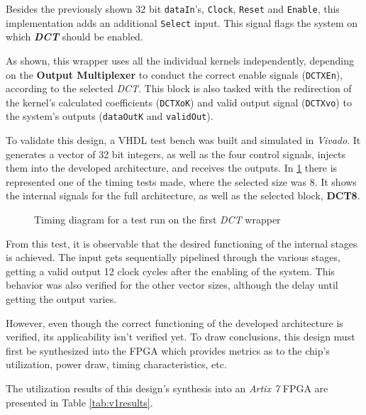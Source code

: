 Besides the previously shown 32 bit \texttt{dataIn}'s, \texttt{Clock}, \texttt{Reset} and \texttt{Enable}, this implementation adds an additional \texttt{Select} input. This signal flags the system on which \emph{\textbf{DCT}} should be enabled.

As shown, this wrapper uses all the individual kernels independently, depending on the \textbf{Output Multiplexer} to conduct the correct enable signals (\texttt{DCTXEn}), according to the selected \emph{DCT}. This block is also tasked with the redirection of the kernel's calculated coefficients (\texttt{DCTXoK}) and valid output signal (\texttt{DCTXvo}) to the system's outputs (\texttt{dataOutK} and \texttt{validOut}).

To validate this design, a VHDL test bench was built and simulated in \emph{Vivado}. It generates a vector of 32 bit integers, as well as the four control signals, injects them into the developed architecture, and receives the outputs. In \ref{fig:v1timing} there is represented one of the timing tests made, where the selected size was 8. It shows the internal signals for the full architecture, as well as the selected block, \textbf{DCT8}.

\begin{figure}[!htbp]
    \centering
    
    \caption{Timing diagram for a test run on the first \emph{DCT} wrapper}
    \label{fig:v1timing}
\end{figure}

From this test, it is observable that the desired functioning of the internal stages is achieved. The input gets sequentially pipelined through the various stages, getting a valid output 12 clock cycles after the enabling of the system. This behavior was also verified for the other vector sizes, although the delay until getting the output varies.

However, even though the correct functioning of the developed architecture is verified, its applicability isn't verified yet. To draw conclusions, this design must first be synthesized into the FPGA which provides metrics as to the chip's utilization, power draw, timing characteristics, etc.

The utilization results of this design's synthesis into an \emph{Artix 7} FPGA are presented in Table \ref{tab:v1results}. 

